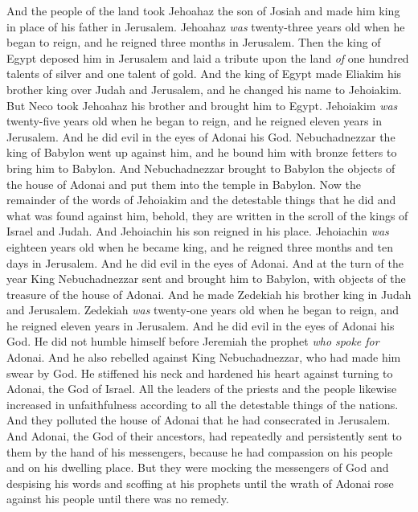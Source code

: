 \begin{biblechapter} %
 And the people of the land took Jehoahaz the son of Josiah and made him king in place of his father in Jerusalem.
\verse Jehoahaz \textit{was} twenty-three years old when he began to reign, and he reigned three months in Jerusalem.
\verse Then the king of Egypt deposed him in Jerusalem and laid a tribute upon the land \textit{of} one hundred talents of silver and one talent of gold.
\verse And the king of Egypt made Eliakim his brother king over Judah and Jerusalem, and he changed his name to Jehoiakim. But Neco took Jehoahaz his brother and brought him to Egypt.
\verse Jehoiakim \textit{was} twenty-five years old when he began to reign, and he reigned eleven years in Jerusalem. And he did evil in the eyes of Adonai his God.
\verse Nebuchadnezzar the king of Babylon went up against him, and he bound him with bronze fetters to bring him to Babylon.
\verse And Nebuchadnezzar brought to Babylon the objects of the house of Adonai and put them into the temple in Babylon.
\verse Now the remainder of the words of Jehoiakim and the detestable things that he did and what was found against him, behold, they are written in the scroll of the kings of Israel and Judah. And Jehoiachin his son reigned in his place.
\verse Jehoiachin \textit{was} eighteen years old when he became king, and he reigned three months and ten days in Jerusalem. And he did evil in the eyes of Adonai.
\verse And at the turn of the year King Nebuchadnezzar sent and brought him to Babylon, with objects of the treasure of the house of Adonai. And he made Zedekiah his brother king in Judah and Jerusalem.
\verse Zedekiah \textit{was} twenty-one years old when he began to reign, and he reigned eleven years in Jerusalem.
\verse And he did evil in the eyes of Adonai his God. He did not humble himself before Jeremiah the prophet \textit{who spoke for} Adonai.
\verse And he also rebelled against King Nebuchadnezzar, who had made him swear by God. He stiffened his neck and hardened his heart against turning to Adonai, the God of Israel.
\verse All the leaders of the priests and the people likewise increased in unfaithfulness according to all the detestable things of the nations. And they polluted the house of Adonai that he had consecrated in Jerusalem.
\verse And Adonai, the God of their ancestors, had repeatedly and persistently sent to them by the hand of his messengers, because he had compassion on his people and on his dwelling place.
\verse But they were mocking the messengers of God and despising his words and scoffing at his prophets until the wrath of Adonai rose against his people until there was no remedy.

\end{biblechapter}
